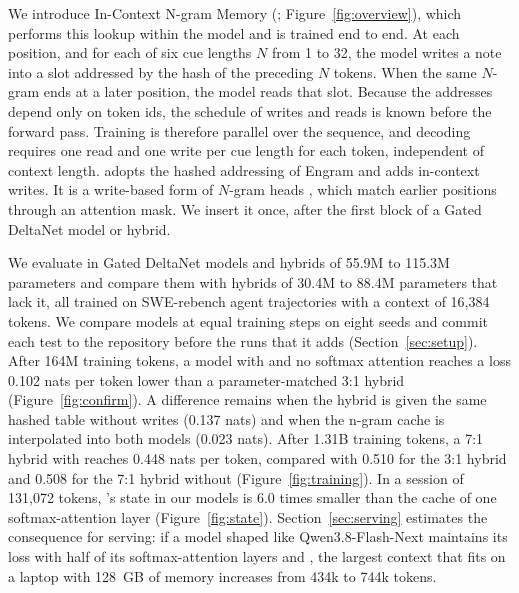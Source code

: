 We introduce In-Context N-gram Memory (\ingram{}; Figure~\ref{fig:overview}), which performs this
lookup within the model and is trained end to end. At each position, and for each of six cue lengths $N$ from 1 to 32, the
model writes a note into a slot addressed by the hash of the preceding $N$ tokens. When the same
$N$-gram ends at a later position, the model reads that slot. Because the addresses depend only on
token ids, the schedule of writes and reads is known before the forward pass. Training is
therefore parallel over the sequence, and decoding requires one read and one write per cue length
for each token, independent of context length. \ingram{} adopts the hashed addressing of Engram
and adds in-context writes. It is a write-based form of $N$-gram heads \citep{akyurek2024}, which
match earlier positions through an attention mask. We insert it once, after the first block of a
Gated DeltaNet model or hybrid.

We evaluate \ingram{} in Gated DeltaNet models and hybrids of 55.9M to 115.3M parameters and
compare them with hybrids of 30.4M to 88.4M parameters that lack it, all trained
on SWE-rebench agent trajectories with a context of 16,384 tokens. We compare models at equal
training steps on eight seeds and commit each test to the repository before the runs that it adds
(Section~\ref{sec:setup}). After 164M training tokens, a model with \ingram{} and no softmax
attention reaches a loss 0.102 nats per token lower than a parameter-matched 3:1 hybrid
(Figure~\ref{fig:confirm}). A
difference remains when the hybrid is given the same hashed table without writes (0.137 nats) and
when the n-gram cache is interpolated into both models (0.023 nats). After 1.31B training tokens,
a 7:1 hybrid with \ingram{} reaches 0.448 nats per token, compared with 0.510 for the 3:1 hybrid
and 0.508 for the 7:1 hybrid without \ingram{} (Figure~\ref{fig:training}). In a session of 131,072 tokens, \ingram{}'s state in our
models is 6.0 times smaller than the cache of one softmax-attention layer
(Figure~\ref{fig:state}). Section~\ref{sec:serving} estimates the consequence for serving: if a model shaped like
Qwen3.8-Flash-Next maintains its loss with half of its softmax-attention layers and \ingram{},
the largest context that fits on a laptop with 128~GB of memory increases from 434k to 744k
tokens.
